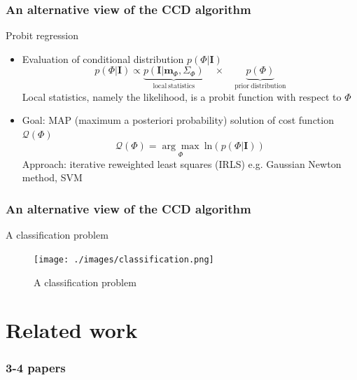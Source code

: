 \documentclass[english,10pt,presentation]{beamer}
\begin{document}
\begin{frame}
\frametitle{An alternative view of the CCD algorithm}
\label{sec-2_3}
\begin{exampleblock}{Probit regression}
\label{sec-2_3_1}
\begin{itemize}

\item Evaluation of conditional distribution $p(\Phi|\mathbf{I})$
\label{sec-2_3_1_1}%
\begin{displaymath}
p(\Phi|\mathbf{I})
\propto \underbrace{p(\mathbf{I}|\mathbf{m}_{\Phi},
\Sigma_{\Phi})}_{\mathrm{local\ statistics}}\quad\times\quad
\underbrace{p(\Phi)}_{\mathrm{prior\ distribution}}
\end{displaymath}
Local statistics, namely the likelihood, is a probit function with
respect to $\Phi$

\item Goal: MAP (maximum a posteriori probability) solution of cost function $\mathcal{Q}(\Phi)$
\label{sec-2_3_1_2}%
\begin{displaymath}
\mathcal{Q}(\Phi) = \underset{\Phi}{\arg\max}\ \mathrm{ln}(p(\Phi|\mathbf{I}))
\end{displaymath}
Approach: iterative reweighted least  squares (IRLS) e.g. Gaussian
Newton method, SVM
\end{itemize} %
\end{exampleblock}
\end{frame}
\begin{frame}
\frametitle{An alternative view of the CCD algorithm}
\label{sec-2_4}
\begin{exampleblock}{A classification problem}
\label{sec-2_4_1}

    \begin{figure}[htb]
    \centering
    \texttt{[image: ./images/classification.png]}
    \caption{\label{fig:class}A classification problem}
    \end{figure}
\end{exampleblock}
\end{frame}
\section{Related work}
\label{sec-3}
\begin{frame}
\frametitle{3-4 papers}
\label{sec-3_1}
\end{frame}
\end{document}
